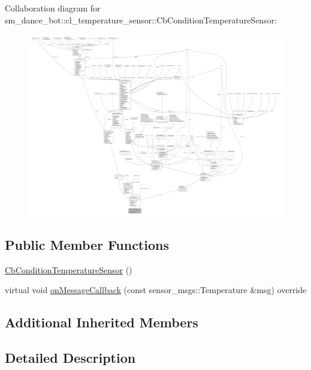 Collaboration diagram for sm\+\_\+dance\+\_\+bot\+:\+:cl\+\_\+temperature\+\_\+sensor\+:\+:Cb\+Condition\+Temperature\+Sensor\+:
\nopagebreak
\begin{figure}[H]
\begin{center}
\leavevmode
\includegraphics[width=350pt]{classsm__dance__bot_1_1cl__temperature__sensor_1_1CbConditionTemperatureSensor__coll__graph}
\end{center}
\end{figure}
\subsection*{Public Member Functions}
\begin{DoxyCompactItemize}
\item 
\hyperlink{classsm__dance__bot_1_1cl__temperature__sensor_1_1CbConditionTemperatureSensor_a9fd6f64ddff322bf3a8b8f0e3783c910}{Cb\+Condition\+Temperature\+Sensor} ()
\item 
virtual void \hyperlink{classsm__dance__bot_1_1cl__temperature__sensor_1_1CbConditionTemperatureSensor_a4794ea051f9b98ed991b125d1a8a55b5}{on\+Message\+Callback} (const sensor\+\_\+msgs\+::\+Temperature \&msg) override
\end{DoxyCompactItemize}
\subsection*{Additional Inherited Members}


\subsection{Detailed Description}


